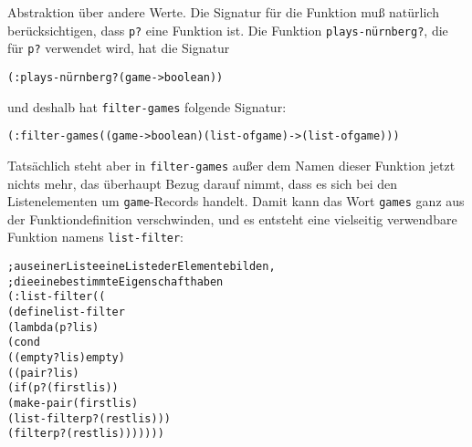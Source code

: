 Abstraktion über andere Werte.  Die Signatur für die Funktion muß
natürlich berücksichtigen, dass \texttt{p?} eine Funktion ist.  Die Funktion
\texttt{plays-nürnberg?}, die für \texttt{p?}  verwendet wird, hat die
Signatur
%
\begin{alltt}
(: plays-nürnberg? (game -> boolean))
\end{alltt}
%
und deshalb hat \texttt{filter-games} folgende Signatur:
%
\begin{alltt}
(: filter-games ((game -> boolean) (list-of game) -> (list-of game)))
\end{alltt}
%
Tatsächlich steht aber in \texttt{filter-games} außer dem Namen dieser Funktion
jetzt nichts mehr, das
überhaupt Bezug darauf nimmt, dass es sich bei den Listenelementen um
\texttt{game}-Records handelt.  %
Damit kann das Wort \texttt{games} ganz aus der Funktiondefinition
verschwinden, und es entsteht eine vielseitig verwendbare Funktion
namens \texttt{list-filter}:
%
\begin{alltt}
; aus einer Liste eine Liste der Elemente bilden,
; die eine bestimmte Eigenschaft haben
(: list-filter ((%a -> boolean) (list-of %a) -> (list-of %a)))
(define list-filter
  (lambda (p? lis)
    (cond
      ((empty? lis) empty)
      ((pair? lis)
       (if (p? (first lis))
           (make-pair (first lis)
                      (list-filter p? (rest lis)))
           (filter p? (rest lis)))))))
\end{alltt}


